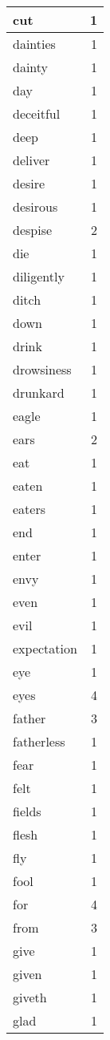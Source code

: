 \begin{center}
\begin{longtable}{l|r}
cut & 1\\ \hline 
dainties & 1\\ \hline 
dainty & 1\\ \hline 
day & 1\\ \hline 
deceitful & 1\\ \hline 
deep & 1\\ \hline 
deliver & 1\\ \hline 
desire & 1\\ \hline 
desirous & 1\\ \hline 
despise & 2\\ \hline 
die & 1\\ \hline 
diligently & 1\\ \hline 
ditch & 1\\ \hline 
down & 1\\ \hline 
drink & 1\\ \hline 
drowsiness & 1\\ \hline 
drunkard & 1\\ \hline 
eagle & 1\\ \hline 
ears & 2\\ \hline 
eat & 1\\ \hline 
eaten & 1\\ \hline 
eaters & 1\\ \hline 
end & 1\\ \hline 
enter & 1\\ \hline 
envy & 1\\ \hline 
even & 1\\ \hline 
evil & 1\\ \hline 
expectation & 1\\ \hline 
eye & 1\\ \hline 
eyes & 4\\ \hline 
father & 3\\ \hline 
fatherless & 1\\ \hline 
fear & 1\\ \hline 
felt & 1\\ \hline 
fields & 1\\ \hline 
flesh & 1\\ \hline 
fly & 1\\ \hline 
fool & 1\\ \hline 
for & 4\\ \hline 
from & 3\\ \hline 
give & 1\\ \hline 
given & 1\\ \hline 
giveth & 1\\ \hline 
glad & 1\\ \hline 

\end{longtable}
\end{center}
